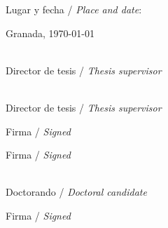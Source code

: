 Lugar y fecha / \textit{Place and date}:

Granada, \today


\noindent\small

\begin{minipage}[t]{.5\textwidth}
\centering
\textbf{\thesisFirstSupervisor}\\
Director de tesis / \textit{Thesis supervisor}
\end{minipage}
\begin{minipage}[t]{.5\textwidth}
\centering
\textbf{\thesisSecondSupervisor}\\
Director de tesis / \textit{Thesis supervisor}
\end{minipage}

\noindent\small
\begin{minipage}[c]{.5\textwidth}
	\centering
	Firma / \textit{Signed}
\end{minipage}
\noindent
\begin{minipage}[c]{.5\textwidth}
	\centering
	Firma / \textit{Signed}
\end{minipage}

\noindent
\begin{center}
	\begin{minipage}[c]{.45\textwidth}
		\centering
		\textbf{\thesisName}\\
		Doctorando / \textit{Doctoral candidate}
	\end{minipage}
\end{center}

\noindent
\begin{center}
	\begin{minipage}[c]{.45\textwidth}
		\centering
	Firma / \textit{Signed}
	\end{minipage}
\end{center}
\endinput

